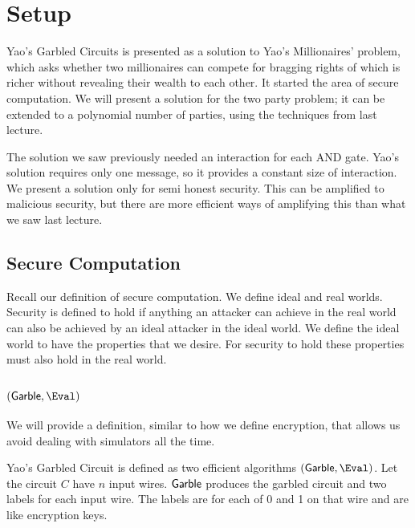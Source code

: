 %

\section{Setup}


Yao's Garbled Circuits is presented as a solution to Yao's Millionaires' problem, 
which asks whether 
two millionaires can compete for bragging rights of which is richer
without revealing their wealth to each other. 
It started the area of secure computation. 
We will present a solution for the two party problem;
it can be extended to a polynomial number of parties,
using the techniques from last lecture.

The solution we saw previously needed an interaction for each AND gate.
Yao's solution requires only one message,
so it provides a constant size of interaction.
We present a solution only for semi honest security. 
This can be amplified to malicious security, 
but there are more efficient ways of amplifying this than what we saw last lecture.

\subsection{Secure Computation}

Recall our definition of secure computation. 
We define ideal and real worlds. 
Security is defined to hold if 
anything an attacker can achieve in the real world 
 can also be achieved by an ideal attacker in the ideal world. 
We define the ideal world to have the properties that we desire. 
For security to hold these properties must also hold in the real world.

\subsection{$(\Garble, \Eval)$}
We will provide a definition, similar to how we define encryption, that allows us avoid dealing with simulators all the time. 


Yao's Garbled Circuit is defined as two efficient algorithms $(\Garble, \Eval)$. Let the circuit $C$ have $n$ input wires.
$\mathsf{Garble}$ produces the garbled circuit and two labels for each input wire. The labels are for each of 0 and 1 on that wire and are like encryption keys. 


